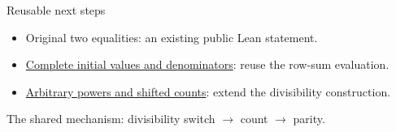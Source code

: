 \documentclass{beamer}
\begin{document}
\begin{frame}{Reusable next steps}
\begin{itemize}
\item Original two equalities: an existing public Lean statement.
\item \href{https://github.com/the-omega-institute/trureturing-requests/issues/234}{Complete initial values and denominators}: reuse the row-sum evaluation.
\item \href{https://github.com/the-omega-institute/trureturing-requests/issues/235}{Arbitrary powers and shifted counts}: extend the divisibility construction.
\end{itemize}
The shared mechanism: divisibility switch $\longrightarrow$ count $\longrightarrow$ parity.
\end{frame}
\appendix
\FormalVerification
\end{document}
